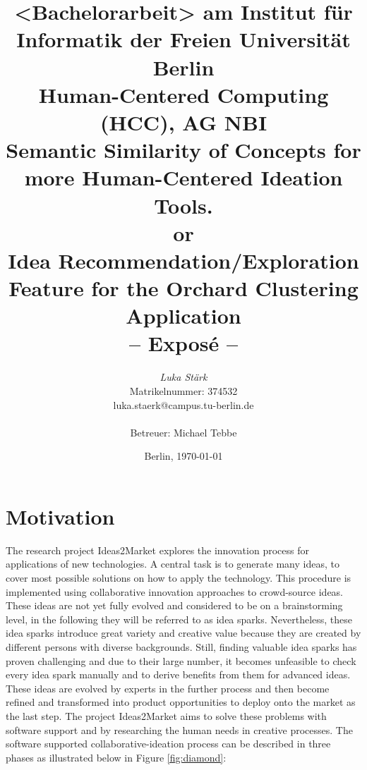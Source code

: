 \documentclass[pdftex,a4paper,12pt]{scrartcl}
\title{
{\small <Bachelorarbeit> am Institut für Informatik der Freien Universität Berlin}\\
{\small Human-Centered Computing (HCC), AG NBI}\\
[6ex]
{\LARGE Semantic Similarity of Concepts for more Human-Centered Ideation Tools. }\\
{\normalsize or}\\
{\LARGE Idea Recommendation/Exploration Feature for the Orchard Clustering Application}\\
{\normalsize-- Exposé --}}
\author{
{\emph{\normalsize Luka Stärk}}\\
{\normalsize Matrikelnummer: 374532}\\
{\normalsize luka.staerk@campus.tu-berlin.de}\\\\
{\normalsize Betreuer: Michael Tebbe}
}
\date{\normalsize Berlin, \today}
\theoremstyle{definition}
\newcommand{\blankpage}{
\newpage
\thispagestyle{empty}
\mbox{}
\newpage
}
\begin{document}
\maketitle 



\thispagestyle{empty}  %
\blankpage

\setcounter{page}{1} %


\section{Motivation} 
    
The research project Ideas2Market explores the innovation process for applications of new technologies. A central task is to generate many ideas, to cover most possible solutions on how to apply the technology. This procedure is implemented using collaborative innovation approaches to crowd-source ideas. These ideas are not yet fully evolved and considered to be on a brainstorming level, in the following they will be referred to as idea sparks. Nevertheless, these idea sparks introduce great variety and creative value because they are created by different persons with diverse backgrounds. Still, finding valuable idea sparks has proven challenging and due to their large number, it becomes unfeasible to check every idea spark manually and to derive benefits from them for advanced ideas. These ideas are evolved by experts in the further process and then become refined and transformed into product opportunities to deploy onto the market as the last step. The project Ideas2Market aims to solve these problems with software support and by researching the human needs in creative processes. The software supported collaborative-ideation process can be described in three phases as illustrated below in Figure \ref{fig:diamond}:
\end{document}
